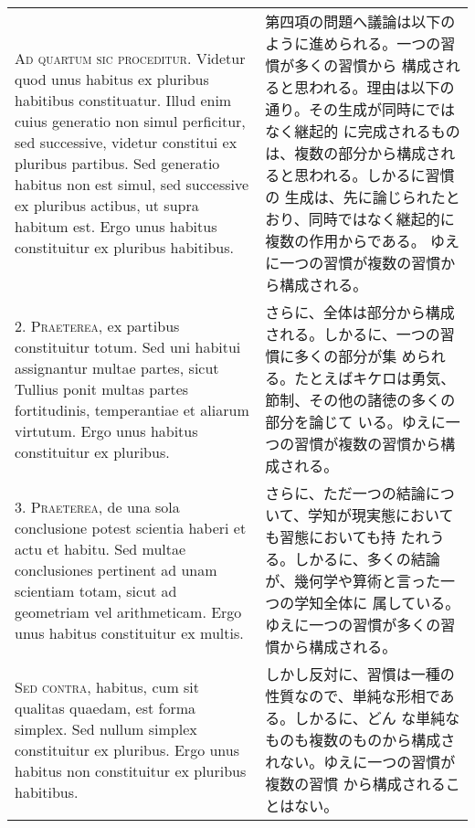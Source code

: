 \documentclass[10pt]{jsarticle}
\begin{document}
\begin{longtable}{p{21em}p{21em}}
{\scshape Ad quartum sic proceditur}. Videtur quod unus habitus ex
pluribus habitibus constituatur. Illud enim cuius generatio non simul
perficitur, sed successive, videtur constitui ex pluribus
partibus. Sed generatio habitus non est simul, sed successive ex
pluribus actibus, ut supra habitum est. Ergo unus habitus constituitur
ex pluribus habitibus.

&

第四項の問題へ議論は以下のように進められる。一つの習慣が多くの習慣から
構成されると思われる。理由は以下の通り。その生成が同時にではなく継起的
に完成されるものは、複数の部分から構成されると思われる。しかるに習慣の
生成は、先に論じられたとおり、同時ではなく継起的に複数の作用からである。
ゆえに一つの習慣が複数の習慣から構成される。

\\

2. {\scshape Praeterea}, ex partibus constituitur totum. Sed uni
habitui assignantur multae partes, sicut Tullius ponit multas partes
fortitudinis, temperantiae et aliarum virtutum. Ergo unus habitus
constituitur ex pluribus.

&

さらに、全体は部分から構成される。しかるに、一つの習慣に多くの部分が集
められる。たとえばキケロは勇気、節制、その他の諸徳の多くの部分を論じて
いる。ゆえに一つの習慣が複数の習慣から構成される。

\\

3. {\scshape Praeterea}, de una sola conclusione potest scientia
haberi et actu et habitu. Sed multae conclusiones pertinent ad unam
scientiam totam, sicut ad geometriam vel arithmeticam. Ergo unus
habitus constituitur ex multis.

&

さらに、ただ一つの結論について、学知が現実態においても習態においても持
たれうる。しかるに、多くの結論が、幾何学や算術と言った一つの学知全体に
属している。ゆえに一つの習慣が多くの習慣から構成される。

\\

{\scshape Sed contra}, habitus, cum sit qualitas quaedam, est forma
simplex. Sed nullum simplex constituitur ex pluribus. Ergo unus
habitus non constituitur ex pluribus habitibus.

&

しかし反対に、習慣は一種の性質なので、単純な形相である。しかるに、どん
な単純なものも複数のものから構成されない。ゆえに一つの習慣が複数の習慣
から構成されることはない。


\end{longtable}
\end{document}
